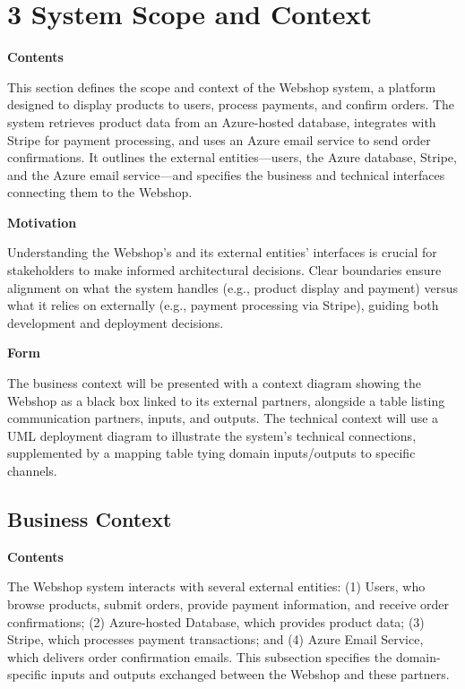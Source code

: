 \hypertarget{section-system-scope-and-context}{%
\section{3 System Scope and Context}\label{section-system-scope-and-context}}

\textbf{Contents}

This section defines the scope and context of the Webshop system, a platform designed to display products to users, process payments, and confirm orders. The system retrieves product data from an Azure-hosted database, integrates with Stripe for payment processing, and uses an Azure email service to send order confirmations. It outlines the external entities—users, the Azure database, Stripe, and the Azure email service—and specifies the business and technical interfaces connecting them to the Webshop.

\textbf{Motivation}

Understanding the Webshop's and its external entities' interfaces is crucial for stakeholders to make informed architectural decisions. Clear boundaries ensure alignment on what the system handles (e.g., product display and payment) versus what it relies on externally (e.g., payment processing via Stripe), guiding both development and deployment decisions.

\textbf{Form}

The business context will be presented with a context diagram showing the Webshop as a black box linked to its external partners, alongside a table listing communication partners, inputs, and outputs. The technical context will use a UML deployment diagram to illustrate the system’s technical connections, supplemented by a mapping table tying domain inputs/outputs to specific channels.

\hypertarget{_business_context}{%
\subsection{Business Context}\label{_business_context}}

\textbf{Contents}

The Webshop system interacts with several external entities: (1) Users, who browse products, submit orders, provide payment information, and receive order confirmations; (2) Azure-hosted Database, which provides product data; (3) Stripe, which processes payment transactions; and (4) Azure Email Service, which delivers order confirmation emails. This subsection specifies the domain-specific inputs and outputs exchanged between the Webshop and these partners.

